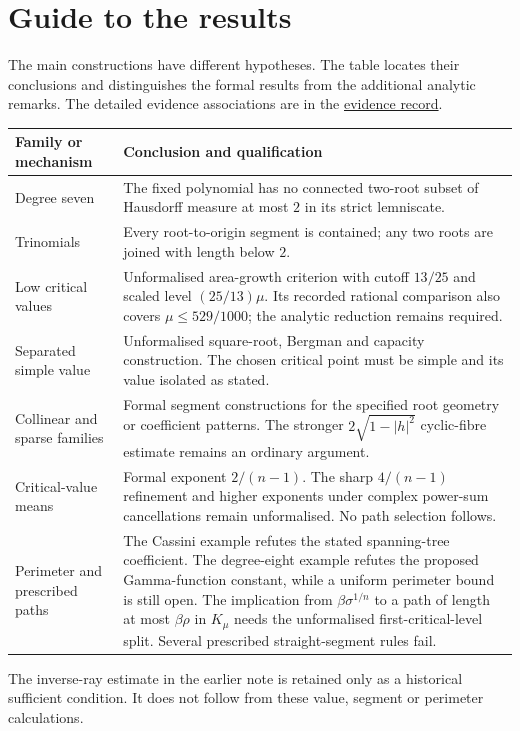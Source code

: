 \section{Guide to the results}\label{sec:erdos-1041-complete-family-map}

The main constructions have different hypotheses. The table locates
their conclusions and distinguishes the formal results from the
additional analytic remarks. The detailed evidence associations are
in the \href{\evidencerecordurl}{evidence record}.
\begin{center}\small
\begin{tabular}{p{.24\linewidth}p{.65\linewidth}}
\toprule
Family or mechanism & Conclusion and qualification \\
\midrule
Degree seven & The fixed polynomial has no connected two-root subset
of Hausdorff measure at most $2$ in its strict lemniscate. \\
Trinomials & Every root-to-origin segment is contained; any two roots
are joined with length below $2$. \\
Low critical values & Unformalised area-growth criterion with cutoff
$13/25$ and scaled level $(25/13)\mu$. Its recorded rational comparison
also covers $\mu\le529/1000$; the analytic reduction remains required. \\
Separated simple value & Unformalised square-root, Bergman and capacity
construction. The chosen critical point must be simple and its value
isolated as stated. \\
Collinear and sparse families & Formal segment constructions for the
specified root geometry or coefficient patterns. The stronger
$2\sqrt{1-|h|^2}$ cyclic-fibre estimate remains an ordinary argument. \\
Critical-value means & Formal exponent $2/(n-1)$. The sharp
$4/(n-1)$ refinement and higher exponents under complex power-sum
cancellations remain unformalised. No path selection follows. \\
Perimeter and prescribed paths & The Cassini example refutes the stated
spanning-tree coefficient. The degree-eight example refutes the proposed
Gamma-function constant, while a uniform perimeter bound is still open.
The implication from $\beta\sigma^{1/n}$ to a path of length at most
$\beta\rho$ in $K_\mu$ needs the unformalised first-critical-level split.
Several prescribed straight-segment rules fail. \\
\bottomrule
\end{tabular}\end{center}
The inverse-ray estimate in the earlier note is retained only as a
historical sufficient condition. It does not follow from these value,
segment or perimeter calculations.

